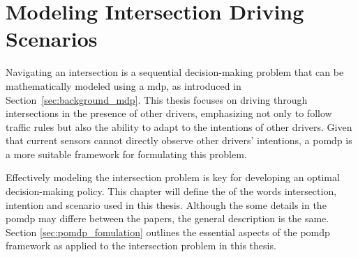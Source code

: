 \newcommand {\matr}[2]{\left[\begin{array}{#1}#2\end{array}\right]}
\newcommand{\E}{\mathbb{E}}
\newcommand{\tr}{\mathrm{tr}}
\newcommand{\x}{{\mathbf{x}}}
\renewcommand{\u}{{\mathbf{u}}}
\newcommand{\w}{{\mathbf{w}}}
\renewcommand{\r}{{\mathbf{r}}}

\chapter{Modeling Intersection Driving Scenarios}
\label{ch:modeling_intersection}

Navigating an intersection is a sequential decision-making problem that can be mathematically modeled using a \gls{mdp}, as introduced in Section~\ref{sec:background_mdp}. This thesis focuses on driving through intersections in the presence of other drivers, emphasizing not only to follow traffic rules but also the ability to adapt to the intentions of other drivers. Given that current sensors cannot directly observe other drivers' intentions, a \gls{pomdp} is a more suitable framework for formulating this problem.


Effectively modeling the intersection problem is key for developing an optimal decision-making policy. This chapter will define the of the words intersection, intention and scenario used in this thesis. Although the some details in the \gls{pomdp} may differe between the papers, the general description is the same. Section \ref{sec:pomdp_fomulation} outlines the essential aspects of the \gls{pomdp} framework as applied to the intersection problem in this thesis.
 
